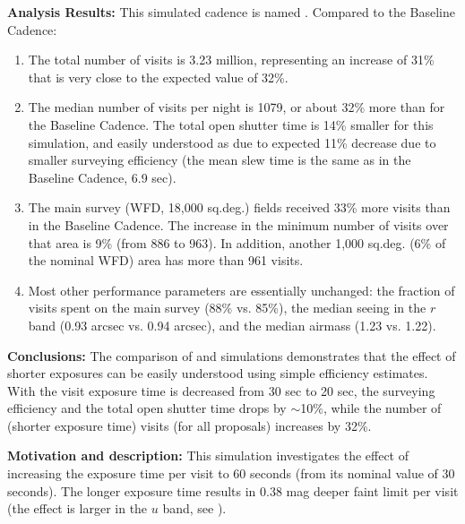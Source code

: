 {\bf Analysis Results:}  This simulated cadence is named
. Compared to the Baseline Cadence:
\begin{enumerate}
\item The total number of visits is 3.23 million, representing an
increase of 31\% that is very close to the expected value of 32\%.
\item The median number of visits per night is 1079, or about 32\%
more than for the Baseline Cadence. The total open shutter time is 14\%
smaller for this simulation, and easily understood as due to expected
11\% decrease due to smaller surveying efficiency (the mean slew time
is the same as in the Baseline Cadence, 6.9 sec).
\item The main survey (WFD, 18,000 sq.deg.) fields received 33\% more
visits than in the Baseline Cadence. The increase in the minimum number of
visits over that area is 9\% (from 886 to 963). In addition, another
1,000 sq.deg. (6\% of the nominal WFD) area has more than 961 visits.
\item Most other performance parameters are essentially unchanged: the
fraction of visits spent on the main survey (88\% vs. 85\%), the
median seeing in the $r$ band (0.93 arcsec vs. 0.94 arcsec), and the
median airmass (1.23 vs. 1.22).
\end{enumerate}

{\bf Conclusions:}
The comparison of  and
 simulations demonstrates that the effect of
shorter exposures can be easily understood using simple efficiency
estimates. With the visit exposure time is decreased from 30 sec to 20
sec, the surveying efficiency and the total open shutter time drops by
$\sim$10\%, while the number of (shorter exposure time) visits (for
all proposals) increases by 32\%.





{\bf Motivation and description:} This simulation investigates the
effect of increasing the exposure time per visit to 60 seconds (from
its nominal value of 30 seconds). The longer exposure time results in
0.38 mag deeper faint limit per visit (the effect is larger in the
$u$ band, see ). \\


